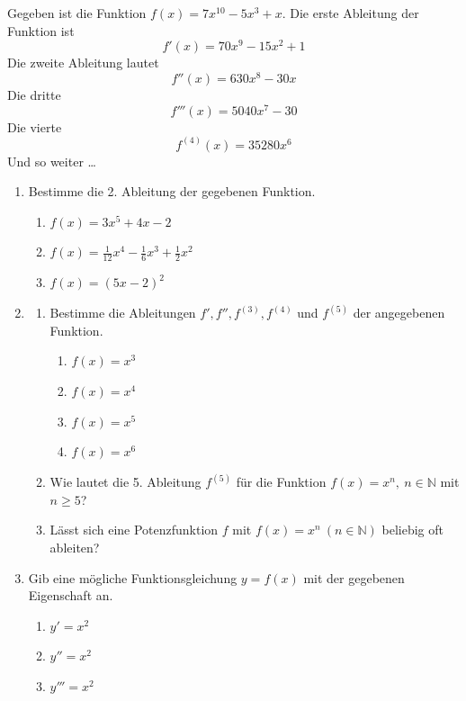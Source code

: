 \begin{bsp}
	{}{}
	Gegeben ist die Funktion $f(x)=7x^{10}-5x^3+x$. Die erste Ableitung der Funktion ist
	$$f'(x)=70x^9-15x^2+1$$
	Die zweite Ableitung lautet
	$$f''(x)=630x^8-30x$$
	Die dritte
	$$f'''(x)=5040x^7-30$$
	Die vierte
	$$f^{(4)}(x)=35280x^6$$
	Und so weiter \dots
\end{bsp}
\clearpage
\begin{ueb}
	{}{}
	\begin{enumerate}
		\item Bestimme die 2. Ableitung der gegebenen Funktion.
		      \begin{enumerate}
			      \item \( f(x) = 3x^5 + 4x - 2 \)
			      \item \( f(x) = \frac{1}{12}x^4 - \frac{1}{6}x^3 + \frac{1}{2}x^2 \)
			      \item \( f(x) = (5x - 2)^2 \)
		      \end{enumerate}
		\item
		      \begin{enumerate}
			      \item Bestimme die Ableitungen \( f', f'', f^{(3)}, f^{(4)} \) und \( f^{(5)} \) der angegebenen Funktion.
			            \begin{enumerate}
				            \item \( f(x) = x^3 \)
				            \item \( f(x) = x^4 \)
				            \item \( f(x) = x^5 \)
				            \item \( f(x) = x^6 \)
			            \end{enumerate}
			      \item Wie lautet die 5. Ableitung \( f^{(5)} \) für die Funktion \( f(x) = x^n,\ n \in \mathbb{N} \) mit \( n \geq 5 \)?
			      \item Lässt sich eine Potenzfunktion \( f \) mit \( f(x) = x^n \ (n \in \mathbb{N}) \) beliebig oft ableiten?
		      \end{enumerate}

		\item Gib eine mögliche Funktionsgleichung \( y = f(x) \) mit der gegebenen Eigenschaft an.
		      \begin{enumerate}
			      \item \( y' = x^2 \)
			      \item \( y'' = x^2 \)
			      \item \( y''' = x^2 \)
		      \end{enumerate}


\end{enumerate}
\end{ueb}
